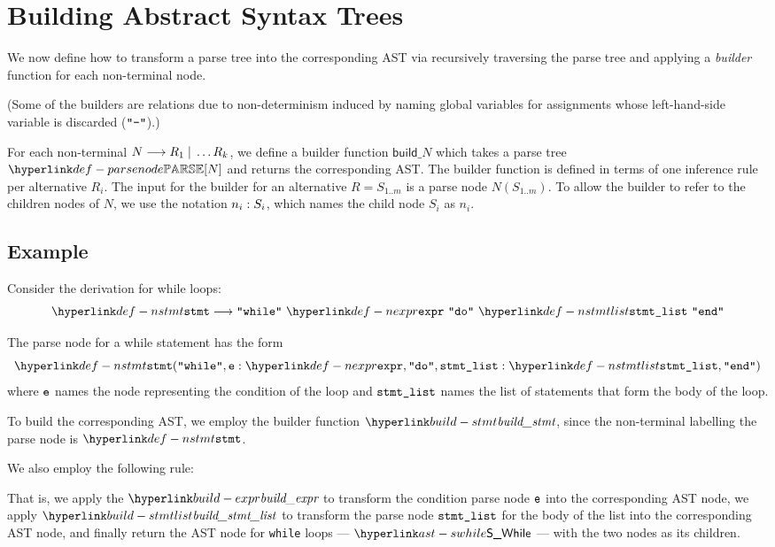 \section{Building Abstract Syntax Trees\label{sec:BuildingAbstractSyntaxTrees}}
We now define how to transform a parse tree into the corresponding AST
via recursively traversing the parse tree and applying a \emph{builder} function
for each non-terminal node.

(Some of the builders are relations due to non-determinism induced by naming global variables
for assignments whose left-hand-side variable is discarded ($\Tminus$).)

For each non-terminal $N \derives R_1 \;|\; \ldots R_k$, we define a builder function
$\textsf{build\_}N $ which takes a parse tree $\parsenode{N}$ and returns the corresponding
AST. The builder function is defined in terms of one inference rule per alternative $R_i$.
The input for the builder for an alternative $R = S_{1..m}$ is a parse node
$N(S_{1..m})$. To allow the builder to refer to the children nodes of $N$,
we use the notation $\namednode{n_i}{S_i}$, which names the child node $S_i$ as $n_i$.

\subsection{Example}
Consider the derivation for while loops:
\[
\Nstmt \derives \Twhile \parsesep \Nexpr \parsesep \Tdo \parsesep \Nstmtlist \parsesep \Tend
\]

The parse node for a while statement has the form
\[
\Nstmt(\Twhile, \namednode{\ve}{\Nexpr}, \Tdo, \namednode{\vstmtlist}{\Nstmtlist}, \Tend)
\]
where $\ve$ names the node representing the condition of the loop and $\vstmtlist$ names
the list of statements that form the body of the loop.

To build the corresponding AST, we employ the builder function $\buildstmt$, since
the non-terminal labelling the parse node is $\Nstmt$.

We also employ the following rule:
\begin{mathpar}
\end{mathpar}
That is, we apply the $\buildexpr$ to transform the condition parse node $\ve$ into the corresponding AST node,
we apply $\buildstmtlist$ to transform the parse node $\vstmtlist$ for the body of the list into the corresponding AST node,
and finally return the AST node for \texttt{while} loops --- $\SWhile$ --- with the two nodes as its children.

